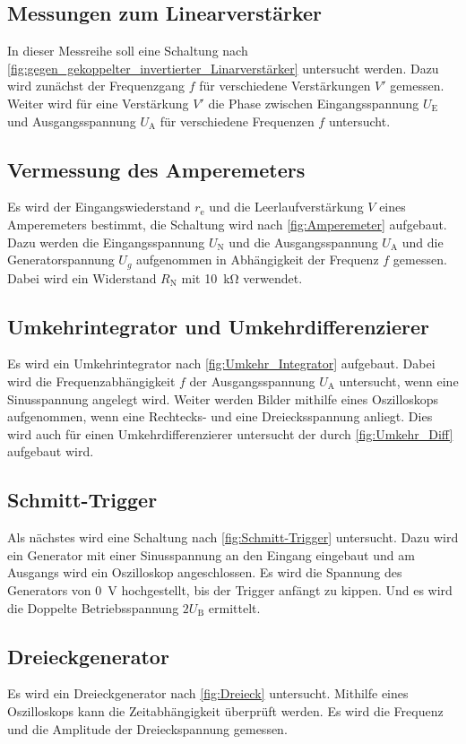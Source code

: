 \subsection{Messungen zum Linearverstärker}
In dieser Messreihe soll eine Schaltung nach \cref{fig:gegen_gekoppelter_invertierter_Linarverstärker} untersucht werden.
Dazu wird zunächst der Frequenzgang $f$ für verschiedene Verstärkungen $V'$ gemessen.
Weiter wird für eine Verstärkung $V'$ die Phase zwischen Eingangsspannung $U_\text{E}$ und Ausgangsspannung $U_\text{A}$ für verschiedene Frequenzen $f$ untersucht.
\subsection{Vermessung des Amperemeters}
Es wird der Eingangswiederstand $r_\text{e}$ und die Leerlaufverstärkung $V$ eines Amperemeters bestimmt, die Schaltung wird nach \cref{fig:Amperemeter} aufgebaut.
Dazu werden die Eingangsspannung $U_\text{N}$ und die Ausgangsspannung $U_\text{A}$ und die Generatorspannung $U_g$ aufgenommen in Abhängigkeit der Frequenz $f$ gemessen.
Dabei wird ein Widerstand $R_\text{N}$ mit \SI{10}{\kilo\ohm} verwendet.
\subsection{Umkehrintegrator und Umkehrdifferenzierer}
Es wird ein Umkehrintegrator nach \cref{fig:Umkehr_Integrator} aufgebaut.
Dabei wird die Frequenzabhängigkeit $f$ der Ausgangsspannung $U_\text{A}$ untersucht, wenn eine Sinusspannung angelegt wird.
Weiter werden Bilder mithilfe eines Oszilloskops aufgenommen, wenn eine Rechtecks- und eine Dreiecksspannung anliegt.
Dies wird auch für einen Umkehrdifferenzierer untersucht der durch \cref{fig:Umkehr_Diff} aufgebaut wird.
\subsection{Schmitt-Trigger}
Als nächstes wird eine Schaltung nach \cref{fig:Schmitt-Trigger} untersucht.
Dazu wird ein Generator mit einer Sinusspannung an den Eingang eingebaut und am Ausgangs wird ein Oszilloskop angeschlossen.
Es wird die Spannung des Generators von \SI{0}{\volt} hochgestellt, bis der Trigger anfängt zu kippen.
Und es wird die Doppelte Betriebsspannung $2U_\text{B}$ ermittelt.
\subsection{Dreieckgenerator}
Es wird ein Dreieckgenerator nach \cref{fig:Dreieck} untersucht.
Mithilfe eines Oszilloskops kann die Zeitabhängigkeit überprüft werden.
Es wird die Frequenz und die Amplitude der Dreieckspannung gemessen.